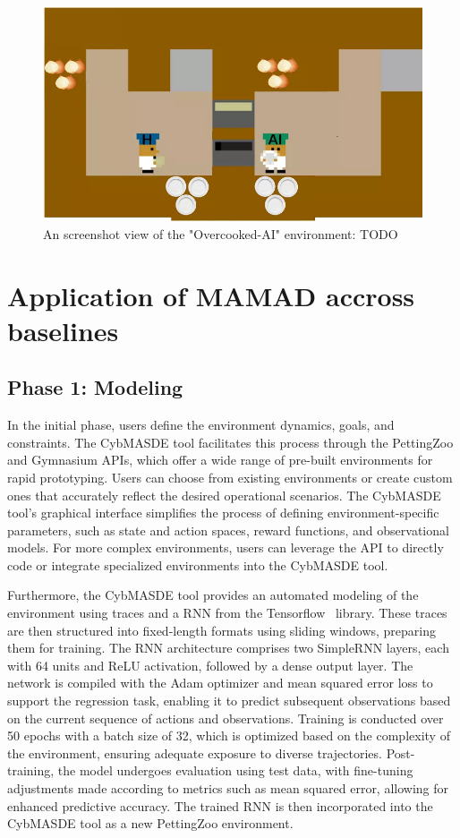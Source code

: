 \documentclass[pdflatex,sn-mathphys-num]{sn-jnl}%
\theoremstyle{thmstyleone}%
\theoremstyle{thmstyletwo}%
\theoremstyle{thmstylethree}%
\begin{document}
  \begin{figure}[h!]
    \centering
    \includegraphics[width=0.7\linewidth]{figures/overcooked.png}
    \caption{An screenshot view of the "Overcooked-AI" environment: TODO}
    \label{fig:overcooked}
  \end{figure}

\section{Application of MAMAD accross baselines}

\subsection{Phase 1: Modeling}

In the initial phase, users define the environment dynamics, goals, and constraints. The CybMASDE tool facilitates this process through the PettingZoo and Gymnasium APIs, which offer a wide range of pre-built environments for rapid prototyping. Users can choose from existing environments or create custom ones that accurately reflect the desired operational scenarios. The CybMASDE tool's graphical interface simplifies the process of defining environment-specific parameters, such as state and action spaces, reward functions, and observational models. For more complex environments, users can leverage the API to directly code or integrate specialized environments into the CybMASDE tool.

Furthermore, the CybMASDE tool provides an automated modeling of the environment using traces and a RNN from the Tensorflow~\cite{tensorflow2015-whitepaper} library.
These traces are then structured into fixed-length formats using sliding windows, preparing them for training. The RNN architecture comprises two SimpleRNN layers, each with 64 units and ReLU activation, followed by a dense output layer. The network is compiled with the Adam optimizer and mean squared error loss to support the regression task, enabling it to predict subsequent observations based on the current sequence of actions and observations. Training is conducted over 50 epochs with a batch size of 32, which is optimized based on the complexity of the environment, ensuring adequate exposure to diverse trajectories. Post-training, the model undergoes evaluation using test data, with fine-tuning adjustments made according to metrics such as mean squared error, allowing for enhanced predictive accuracy. The trained RNN is then incorporated into the CybMASDE tool as a new PettingZoo environment.
\end{document}
